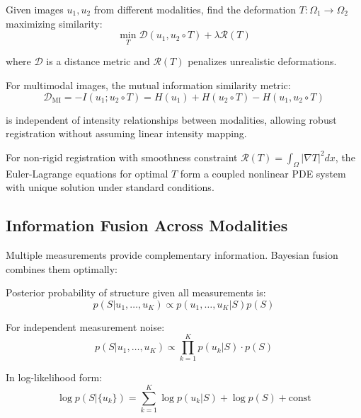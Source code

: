 \documentclass[twocolumn,11pt]{article}
\begin{document}
\begin{definition}
Given images $u_1, u_2$ from different modalities, find the deformation $T: \Omega_1 \to \Omega_2$ maximizing similarity:
\begin{equation}
\min_{T} \mathcal{D}(u_1, u_2 \circ T) + \lambda \mathcal{R}(T)
\end{equation}

where $\mathcal{D}$ is a distance metric and $\mathcal{R}(T)$ penalizes unrealistic deformations.
\end{definition}

\begin{theorem}
For multimodal images, the mutual information similarity metric:
\begin{equation}
\mathcal{D}_{\text{MI}} = -I(u_1; u_2 \circ T) = H(u_1) + H(u_2 \circ T) - H(u_1, u_2 \circ T)
\end{equation}

is independent of intensity relationships between modalities, allowing robust registration without assuming linear intensity mapping.

For non-rigid registration with smoothness constraint $\mathcal{R}(T) = \int_\Omega |\nabla T|^2 dx$, the Euler-Lagrange equations for optimal $T$ form a coupled nonlinear PDE system with unique solution under standard conditions.
\end{theorem}

\subsection{Information Fusion Across Modalities}

Multiple measurements provide complementary information. Bayesian fusion combines them optimally:

\begin{definition}
Posterior probability of structure given all measurements is:
\begin{equation}
p(S | u_1, \ldots, u_K) \propto p(u_1, \ldots, u_K | S) p(S)
\end{equation}

For independent measurement noise:
\begin{equation}
p(S | u_1, \ldots, u_K) \propto \prod_{k=1}^K p(u_k | S) \cdot p(S)
\end{equation}

In log-likelihood form:
\begin{equation}
\log p(S | \{u_k\}) = \sum_{k=1}^K \log p(u_k | S) + \log p(S) + \text{const}
\end{equation}
\end{definition}
\end{document}
